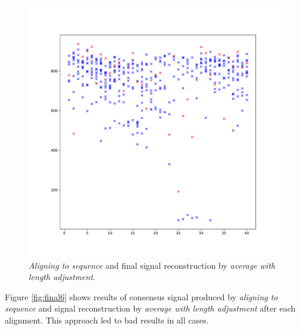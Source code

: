 \begin{figure}
  \centering
  \includegraphics[width=1.0\textwidth]{images/final2}
  \caption{\textit{Aligning to sequence} and final signal reconstruction by \textit{average with length adjustment}.}
  \label{fig:final2}
\end{figure}


Figure \ref{fig:final6} shows results of consensus signal produced by \textit{aligning to sequence} and
signal reconstruction by \textit{average with length adjustment} after each alignment. This approach led to bad results
in all cases. 

